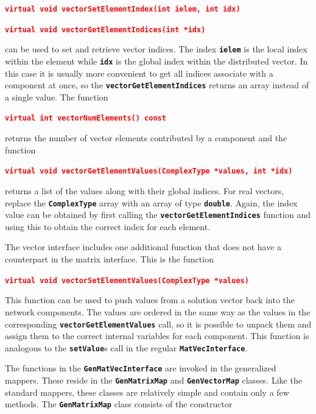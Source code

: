 \documentclass[12pt]{report} %
\begin{document}
\textcolor{red}{\texttt{\textbf{virtual void vectorSetElementIndex(int ielem, int idx)}}}

\textcolor{red}{\texttt{\textbf{virtual void vectorGetElementIndices(int *idx)}}}

can be used to set and retrieve vector indices. The index \texttt{\textbf{ielem}} is the local index within the element while \texttt{\textbf{idx}} is the global index within the distributed vector. In this case it is usually more convenient to get all indices associate with a component at once, so the \texttt{\textbf{vectorGetElementIndices}} returns an array instead of a single value. The function

\textcolor{red}{\texttt{\textbf{virtual int vectorNumElements() const}}}

returns the number of vector elements contributed by a component and the function

\textcolor{red}{\texttt{\textbf{virtual void vectorGetElementValues(ComplexType *values, int *idx)}}}

returns a list of the values along with their global indices. For real vectors, replace the \texttt{\textbf{ComplexType}} array with an array of type \texttt{\textbf{double}}. Again, the index value can be obtained by first calling the \texttt{\textbf{vectorGetElementIndices}} function and using this to obtain the correct index for each element.

The vector interface includes one additional function that does not have a counterpart in the matrix interface. This is the function

\textcolor{red}{\texttt{\textbf{virtual void vectorSetElementValues(ComplexType *values)}}}

This function can be used to push values from a solution vector back into the network components. The values are ordered in the same way as the values in the corresponding \texttt{\textbf{vectorGetElementValues}} call, so it is possible to unpack them and assign them to the correct internal variables for each component. This function is analogous to the \texttt{\textbf{setValue}}s call in the regular \texttt{\textbf{MatVecInterface}}.

The functions in the \texttt{\textbf{GenMatVecInterface}} are invoked in the generalized mappers. These reside in the \texttt{\textbf{GenMatrixMap}} and \texttt{\textbf{GenVectorMap}} classes. Like the standard mappers, these classes are relatively simple and contain only a few methods. The \texttt{\textbf{GenMatrixMap}} class consists of the constructor
\end{document}
